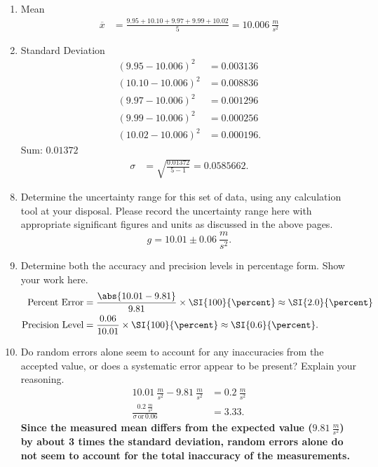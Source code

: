 \begin{remark}
	~
	\begin{enumerate}
		\item Mean
		      \begin{align*}
			      \overline{x} &= \frac{9.95+10.10+9.97+9.99+10.02}{5} = \SI{10.006}{\frac{m}{s^2}}
		      \end{align*}
		\item Standard Deviation
		      \begin{align*}
			      \left( 9.95-10.006 \right)^2 &= 0.003136 \\
			      \left( 10.10-10.006 \right)^2 &= 0.008836 \\
			      \left( 9.97-10.006 \right)^2 &= 0.001296 \\
			      \left( 9.99-10.006 \right)^2 &= 0.000256 \\
			      \left( 10.02-10.006 \right)^2 &= 0.000196
			      .\end{align*}
		      Sum: $0.01372$
		      \begin{align*}
			      \sigma &= \sqrt{\frac{0.01372}{5-1}} = 0.0585662
			      .\end{align*}
	\end{enumerate}
\end{remark}

\begin{enumerate}
	\setcounter{enumi}{7}
	\item Determine the uncertainty range for this set of data, using any calculation tool at your disposal.  Please record the uncertainty range here with appropriate significant figures and units as discussed in the above pages.
	      \[
		      g = 10.01 \pm \SI{0.06}{\frac{m}{s^2}}
		      .\]
	\item Determine both the accuracy and precision levels in percentage form.  Show your work here.
	      \begin{align*}
		      \text{Percent Error} &= \frac{\abs{ 10.01 - 9.81 }}{9.81} \times \SI{100}{\percent} \approx \SI{2.0}{\percent} \\
		      \text{Precision Level} &= \frac{0.06}{10.01} \times \SI{100}{\percent} \approx \SI{0.6}{\percent}
		      .\end{align*}
	\item Do random errors alone seem to account for any inaccuracies from the accepted value, or does a systematic error appear to be present?  Explain your reasoning.
	      \begin{align*}
		      \SI{10.01}{\frac{m}{s^2}} - \SI{9.81}{\frac{m}{s^2}} &= \SI{0.2}{\frac{m}{s^2}} \\
		      \frac{\SI{0.2}{\frac{m}{s^2}}}{\sigma \, \text{or} \, 0.06} &= 3.33
		      .\end{align*}
	      \textbf{Since the measured mean differs from the expected value ($\SI{9.81}{\frac{m}{s^2}}$) by about 3 times the standard deviation, random errors alone do not seem to account for the total inaccuracy of the measurements.}
\end{enumerate}

